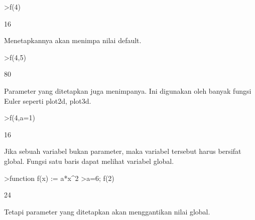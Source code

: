 \documentclass[a4paper,10pt]{article}
\begin{document}
\begin{eulernotebook}
\begin{eulercomment}
\begin{eulercomment}
\begin{eulercomment}
\end{eulercomment}
\begin{eulerprompt}
>f(4)
\end{eulerprompt}
\begin{euleroutput}
  16
\end{euleroutput}
\begin{eulercomment}
Menetapkannya akan menimpa nilai default.
\end{eulercomment}
\begin{eulerprompt}
>f(4,5)
\end{eulerprompt}
\begin{euleroutput}
  80
\end{euleroutput}
\begin{eulercomment}
Parameter yang ditetapkan juga menimpanya. Ini digunakan oleh banyak
fungsi Euler seperti plot2d, plot3d.
\end{eulercomment}
\begin{eulerprompt}
>f(4,a=1)
\end{eulerprompt}
\begin{euleroutput}
  16
\end{euleroutput}
\begin{eulercomment}
Jika sebuah variabel bukan parameter, maka variabel tersebut harus
bersifat global. Fungsi satu baris dapat melihat variabel global.
\end{eulercomment}
\begin{eulerprompt}
>function f(x) := a*x^2
>a=6; f(2)
\end{eulerprompt}
\begin{euleroutput}
  24
\end{euleroutput}
\begin{eulercomment}
Tetapi parameter yang ditetapkan akan menggantikan nilai global.


\end{eulercomment}
\end{eulercomment}
\end{eulercomment}
\end{eulernotebook}
\end{document}
